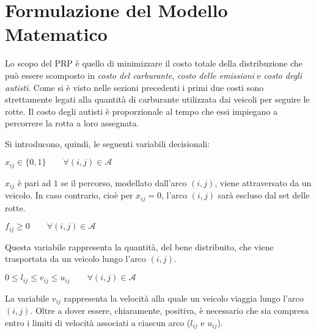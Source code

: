 \chapter{Formulazione del Modello Matematico}\label{ch:model}

	Lo scopo del PRP è quello di minimizzare il costo totale della distribuzione che può essere scomposto in \emph{costo del carburante}, \emph{costo delle emissioni} e \emph{costo degli autisti}. Come si è visto nelle sezioni precedenti i primi due costi sono strettamente legati alla quantità di carburante utilizzata dai veicoli per seguire le rotte. Il costo degli autisti è proporzionale al tempo che essi impiegano a percorrere la rotta a loro assegnata.

	Si introducono, quindi, le seguenti variabili decisionali:

	\newlength{\varwidth}
	\setlength{\varwidth}{0.40\textwidth}
	\newlength{\descwidth}
	\setlength{\descwidth}{0.59\textwidth}

	\begin{minipage}[t]{\varwidth}
		$x_{ij} \in \{0,1\} \qquad \forall (i,j) \in \mathcal{A}$
	\end{minipage}
	\begin{minipage}[t]{\descwidth}
		$x_{ij}$ è pari ad $1$ se il percorso, modellato dall’arco $(i,j)$, viene attraversato da un veicolo. In caso contrario, cioè per $x_{ij} = 0$, l’arco $(i,j)$ sarà escluso dal set delle rotte.
	\end{minipage}

	\begin{minipage}[t]{\varwidth}
		$f_{ij} \geq 0 \qquad \forall (i,j) \in \mathcal{A}$
	\end{minipage}
	\begin{minipage}[t]{\descwidth}
		Questa variabile rappresenta la quantità, del bene distribuito, che viene trasportata da un veicolo lungo l’arco $(i,j)$.
	\end{minipage}

	\begin{minipage}[t]{\varwidth}
		$0 \leq l_{ij} \leq v_{ij} \leq u_{ij} \qquad \forall (i,j) \in \mathcal{A}$
	\end{minipage}
	\begin{minipage}[t]{\descwidth}
		La variabile $v_{ij}$ rappresenta la velocità alla quale un veicolo viaggia lungo l’arco $(i,j)$. Oltre a dover essere, chiaramente, positiva, è necessario che sia compresa entro i limiti di velocità associati a ciascun arco ($l_{ij}$ e $u_{ij}$).
	\end{minipage}

